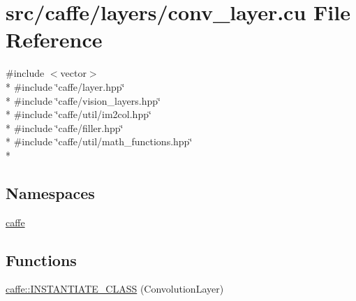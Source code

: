 \hypertarget{conv__layer_8cu}{\section{src/caffe/layers/conv\+\_\+layer.cu File Reference}
\label{conv__layer_8cu}
}
{\ttfamily \#include $<$vector$>$}\\*
{\ttfamily \#include \char`\"{}caffe/layer.\+hpp\char`\"{}}\\*
{\ttfamily \#include \char`\"{}caffe/vision\+\_\+layers.\+hpp\char`\"{}}\\*
{\ttfamily \#include \char`\"{}caffe/util/im2col.\+hpp\char`\"{}}\\*
{\ttfamily \#include \char`\"{}caffe/filler.\+hpp\char`\"{}}\\*
{\ttfamily \#include \char`\"{}caffe/util/math\+\_\+functions.\+hpp\char`\"{}}\\*
\subsection*{Namespaces}
\begin{DoxyCompactItemize}
\item 
 \hyperlink{namespacecaffe}{caffe}
\end{DoxyCompactItemize}
\subsection*{Functions}
\begin{DoxyCompactItemize}
\item 
\hyperlink{namespacecaffe_a0d0970b7b84f0b52deea86972f5cce4d}{caffe\+::\+I\+N\+S\+T\+A\+N\+T\+I\+A\+T\+E\+\_\+\+C\+L\+A\+S\+S} (Convolution\+Layer)
\end{DoxyCompactItemize}
